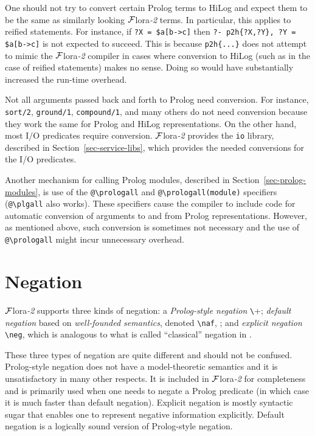 \documentclass[11pt]{article}
\newcommand{\FLORA}{{\mbox{\sc ${\cal F}${lora}\rm\emph{-2}}}\xspace}
\newcommand{\FLSYSTEM}{\FLORA}
\newcommand{\bs}{\textbackslash}
\newcommand{\PLGNAF}{\mbox{\texttt{\bs}+}\xspace}
\newcommand{\RULELOGNAF}{{\texttt{{\bs}naf}}\xspace}
\newcommand{\RULELOGNEG}{{\texttt{{\bs}neg}}\xspace}
\begin{document}
One should not try to convert certain Prolog terms to
HiLog and expect them to be the same as similarly looking \FLSYSTEM terms. In
particular, this applies to reified statements. For instance, if {\tt ?X =
\${a[b->c]}} then {\tt ?- p2h\{?X,?Y\}, ?Y = \${a[b->c]}} is not expected to
succeed. This is because {\tt p2h\{...\}} does not attempt to mimic the \FLSYSTEM
compiler in cases where conversion to HiLog (such as in the case of reified
statements) makes no sense. Doing so would have substantially increased the
run-time overhead.


Not all arguments passed back and forth to Prolog need conversion. For
instance, {\tt sort/2}, {\tt ground/1}, {\tt compound/1}, and many others
do not need conversion because they work the same for Prolog and HiLog
representations. On the other hand, most I/O predicates require conversion.
\FLSYSTEM provides the {\tt io} library, described in
Section~\ref{sec-service-libs}, which provides the needed conversions for
the I/O predicates.


\index{"@\bs{}prologall}
\index{"@\bs{}plgall}
Another mechanism for calling Prolog modules, described in
Section~\ref{sec-prolog-modules}, is use of the {\tt @\bs{}prologall} and
{\tt @\bs{}prologall(module)} specifiers ({\tt @\bs{}plgall} also works). These
specifiers cause the compiler to include code for automatic conversion of
arguments to and from Prolog representations. However, as mentioned above,
such conversion is sometimes not necessary and the use of {\tt
  @\bs{}prologall} might incur unnecessary overhead.



\section{Negation} \label{sec:negation}


\FLSYSTEM supports three kinds of negation: a \emph{Prolog-style negation}
  \PLGNAF \cite{Cla78}; \emph{default negation} based on
\emph{well-founded semantics}, denoted \texttt{\RULELOGNAF}, 
\cite{gelder-alternating-89,gelder-ross-schlipf-91}; and \emph{explicit
  negation} \texttt{\RULELOGNEG}, which is analogous to what is called ``classical'' negation in
\cite{gelfond91classical}.
 
These three types of negation are quite different and should not be
confused. Prolog-style negation does not have a model-theoretic semantics
and it is unsatisfactory in many other respects. It is included in \FLSYSTEM
for completeness and is primarily used when one needs to negate a Prolog
predicate (in which case it is much faster than default negation).
Explicit negation is mostly syntactic sugar that enables one to represent
negative information explicitly. Default negation is a logically sound
version of Prolog-style negation.
\end{document}
